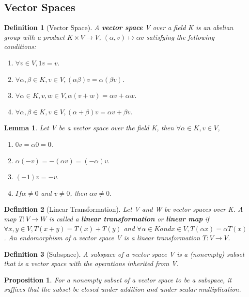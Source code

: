 \documentclass[12pt]{article}
\newtheorem{definition}{Definition}[subsection]
\newtheorem{proposition}{Proposition}[subsection]
\newtheorem{lemma}{Lemma}[subsection]
\begin{document}
    \subsection{Vector Spaces}
        \begin{definition}[Vector Space]
            A \textbf{vector space} V over a field K is an abelian group with a product $K \times V \rightarrow V$, $(\alpha, v) \mapsto \alpha v$ satisfying the following conditions:
                \begin{enumerate}
                    \item $\forall v \in V, 1v = v.$
                    \item $\forall \alpha, \beta \in K, v \in V, (\alpha\beta)v = \alpha(\beta v).$
                    \item $\forall \alpha \in K, v,w \in V, \alpha(v + w) = \alpha v + \alpha w.$
                    \item $\forall \alpha , \beta \in K, v \in V, (\alpha + \beta)v = \alpha v + \beta v.$
                \end{enumerate}
        \end{definition}
        \begin{lemma}
            Let V be a vector space over the field K, then $\forall \alpha \in K, v \in V$,
            \begin{enumerate}
                \item $0v = \alpha 0 = 0.$
                \item $\alpha (-v) = -(\alpha v) = (-\alpha)v.$
                \item $(-1)v = -v.$
                \item $If \alpha \neq 0$ and $v \neq 0$, then $\alpha v \neq 0.$
            \end{enumerate}
        \end{lemma}

        \begin{definition}[Linear Transformation]
            Let V and W be vector spaces over K. A map $T: V \rightarrow W$ is called a \textbf{linear transformation} or \textbf{linear map} if $\forall x,y \in V, T(x + y) = T(x) + T(y)$ and $\forall \alpha \in K and x \in V, T(\alpha x) = \alpha T(x)$. An endomorphism of a vector space V is a linear transformation $T: V \rightarrow V$.
        \end{definition}
        \begin{definition}[Subspace]
            A subspace of a vector space V is a (nonempty) subset that is a vector space with the operations inherited from V.
        \end{definition}
        \begin{proposition}
            For a nonempty subset of a vector space to be a subspace, it suffices that the subset be closed under addition and under scalar multiplication.
        \end{proposition}
\end{document}
